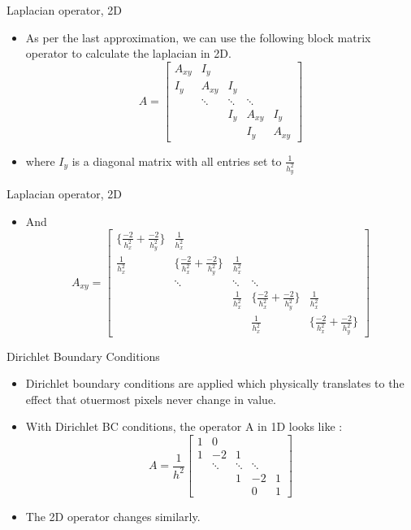 \documentclass{beamer}
\begin{document}
\begin{frame}{Laplacian operator, 2D}
\begin{itemize}
	\item As per the last approximation, we can use the following block matrix operator to calculate the laplacian in 2D.
	\[A =
	\begin{bmatrix}
	A_{xy} & I_y  & & &  \\
	I_y  & A_{xy} & I_y & & \\
	&\ddots & \ddots & \ddots &\\
	&&I_y  & A_{xy} & I_y\\
	&&& I_y & A_{xy}
	\end{bmatrix}
	\]
	\item where $I_y$ is a diagonal matrix with all entries set to $\frac{1}{h_y^2}$
\end{itemize}
\end{frame}

\begin{frame}{Laplacian operator, 2D}
\begin{itemize}

	\item And 
\[A_{xy} = 
\begin{bmatrix}
\{\frac{-2}{h_x^2}+\frac{-2}{h_y^2}\} & \frac{1}{h_x^2}  & & &  \\
\frac{1}{h_x^2} &\{\frac{-2}{h_x^2}+\frac{-2}{h_y^2}\} & \frac{1}{h_x^2} & & \\
&\ddots & \ddots & \ddots &\\
&&\frac{1}{h_x^2}  & \{\frac{-2}{h_x^2}+\frac{-2}{h_y^2}\} & \frac{1}{h_x^2}\\
&&& \frac{1}{h_x^2} & \{\frac{-2}{h_x^2}+\frac{-2}{h_y^2}\}
\end{bmatrix}
\]
\end{itemize}
\end{frame}


\begin{frame}{Dirichlet Boundary Conditions}
\begin{itemize}
	\item Dirichlet boundary conditions are applied which physically translates to the effect that otuermost pixels never change in value. 
	\item With Dirichlet BC conditions, the operator A in 1D looks like :
		\[A = \frac{1}{h^{2}}
	\begin{bmatrix}
	1 & 0  & & &  \\
	1  & -2 & 1 & & \\
	&\ddots & \ddots & \ddots &\\
	&&1  & -2 & 1\\
	&&& 0 & 1
	\end{bmatrix}
	\]
	\item The 2D operator changes similarly.
\end{itemize}
\end{frame}
\end{document}
